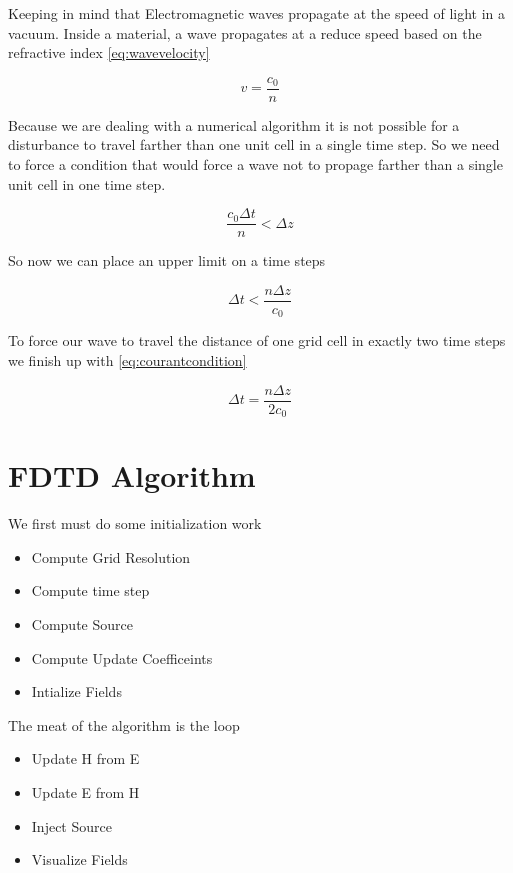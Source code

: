 \documentclass[a4paper,10pt]{article}
\begin{document}
Keeping in mind that Electromagnetic waves propagate at the speed of light in a vacuum.  Inside a material, a wave propagates at a reduce speed based on the refractive index \eqref{eq:wavevelocity}

\begin{equation}
 \label{eq:wavevelocity}
 v = \frac{c_0}{n}
\end{equation}

Because we are dealing with a numerical algorithm it is not possible for a disturbance to travel farther than one unit cell in a single time step.  So we need to force a condition that would force a wave not to propage farther than a single unit cell in one time step.

\begin{equation*}
 \frac{c_0 \Delta t}{n} < \Delta z
\end{equation*}

So now we can place an upper limit on a time steps

\begin{equation*}
 \Delta t < \frac{n \Delta z}{c_0}
\end{equation*}

To force our wave to travel the distance of one grid cell in exactly two time steps we finish up with \eqref{eq:courantcondition}

\begin{equation}
 \Delta t = \frac{n \Delta z}{2c_0}
\end{equation}


\section{FDTD Algorithm}

We first must do some initialization work
\begin{itemize}
 \item Compute Grid Resolution
 \item Compute time step
 \item Compute Source
 \item Compute Update Coefficeints
 \item Intialize Fields
\end{itemize}


The meat of the algorithm is the loop

\begin{itemize}
 \item Update H from E
 \item Update E from H
 \item Inject Source
 \item Visualize Fields
\end{itemize}
\end{document}
